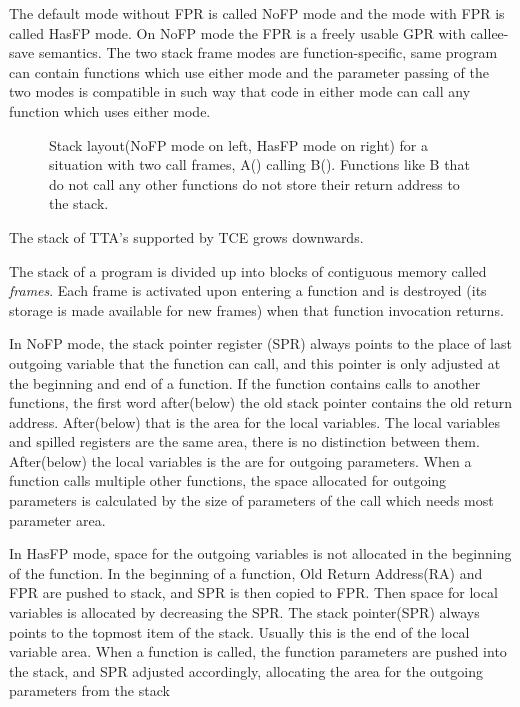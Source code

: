 \documentclass[twoside]{tceusermanual}
\begin{document}
The default mode without FPR is called NoFP mode and the mode with FPR is
called HasFP mode. On NoFP mode the FPR is a freely usable GPR with
callee-save semantics.
The two stack frame modes are function-specific, same program can contain
functions which use either mode and the parameter passing of the two modes
is compatible in such way that code in either mode can call any function
which uses either mode.

\begin{figure}[t]
  \centerline{
  }
  \caption{Stack layout(NoFP mode on left, HasFP mode on right)
for a situation with two call frames, A() calling B().
Functions like B that do not call any other functions do not store
their return address to the stack.}
  \label{fig:stack-frame}
\end{figure}

The stack of TTA's supported by TCE grows downwards.

The stack of a program is divided up into blocks of contiguous memory called
\emph{frames}. Each frame is activated upon entering a function and is
destroyed (its storage is made available for new frames) when that function
invocation returns.

In NoFP mode, the stack pointer register (SPR) always points to the
place of last outgoing variable that the function can call, and this
pointer is only adjusted at the beginning and end of a function.
If the function contains calls to another functions, the first word
after(below) the old stack pointer contains the old return address.
After(below) that is the area for the local variables.
The local variables and spilled registers are the same area, there is no
distinction between them.
After(below) the local variables is the are for outgoing parameters.
When a function calls multiple other functions,
the space allocated for outgoing parameters is calculated by the size
of parameters of the call which needs most parameter area.

In HasFP mode, space for the outgoing variables is not allocated
in the beginning of the function. In the beginning of a function,
Old Return Address(RA) and FPR are pushed to stack,
and SPR is then copied to FPR.
Then space for local variables is allocated by decreasing the SPR.
The stack pointer(SPR) always points to the topmost item
of the stack. Usually this is the end of the local variable area.
When a function is called, the function parameters are pushed into the
stack, and SPR adjusted accordingly, allocating the area for the outgoing
parameters from the stack
\end{document}
